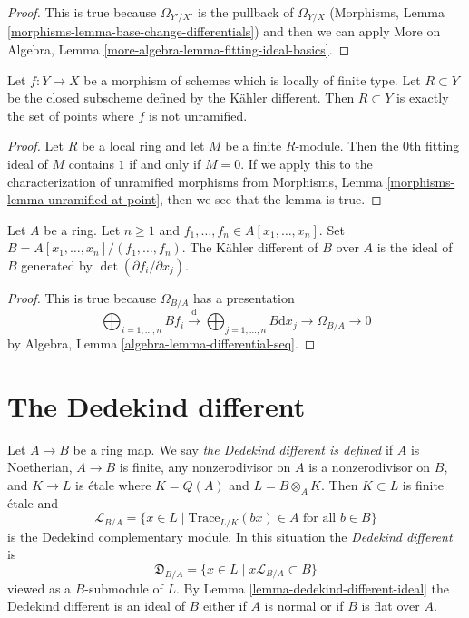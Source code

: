 \begin{proof}
This is true because $\Omega_{Y'/X'}$ is the pullback of $\Omega_{Y/X}$
(Morphisms, Lemma \ref{morphisms-lemma-base-change-differentials})
and then we can apply
More on Algebra, Lemma \ref{more-algebra-lemma-fitting-ideal-basics}.
\end{proof}

\begin{lemma}
\label{lemma-kahler-different}
Let $f : Y \to X$ be a morphism of schemes which is locally of finite type.
Let $R \subset Y$ be the closed subscheme defined by
the K\"ahler different. Then $R \subset Y$ is exactly
the set of points where $f$ is not unramified.
\end{lemma}

\begin{proof}
Let $R$ be a local ring and let $M$ be a finite $R$-module.
Then the $0$th fitting ideal of $M$ contains $1$ if and only
if $M = 0$. If we apply this to the characterization of
unramified morphisms from
Morphisms, Lemma \ref{morphisms-lemma-unramified-at-point},
then we see that the lemma is true.
\end{proof}

\begin{lemma}
\label{lemma-kahler-different-complete-intersection}
Let $A$ be a ring. Let $n \geq 1$ and
$f_1, \ldots, f_n \in A[x_1, \ldots, x_n]$.
Set $B = A[x_1, \ldots, x_n]/(f_1, \ldots, f_n)$.
The K\"ahler different of $B$ over $A$ is the ideal
of $B$ generated by $\det(\partial f_i/\partial x_j)$.
\end{lemma}

\begin{proof}
This is true because $\Omega_{B/A}$ has a presentation
$$
\bigoplus\nolimits_{i = 1, \ldots, n} B f_i
\xrightarrow{\text{d}}
\bigoplus\nolimits_{j = 1, \ldots, n} B \text{d}x_j
\rightarrow \Omega_{B/A} \rightarrow 0
$$
by Algebra, Lemma \ref{algebra-lemma-differential-seq}.
\end{proof}



\section{The Dedekind different}
\label{section-dedekind-different}

\noindent
Let $A \to B$ be a ring map. We say {\it the Dedekind different is defined}
if $A$ is Noetherian, $A \to B$ is finite,
any nonzerodivisor on $A$ is a nonzerodivisor on $B$, and $K \to L$ is
\'etale where $K = Q(A)$ and $L = B \otimes_A K$. Then $K \subset L$ is
finite \'etale and
$$
\mathcal{L}_{B/A} = \{x \in L \mid \text{Trace}_{L/K}(bx) \in A
\text{ for all }b \in B\}
$$
is the Dedekind complementary module. In this situation the
{\it Dedekind different} is
$$
\mathfrak{D}_{B/A} = \{x \in L \mid x\mathcal{L}_{B/A} \subset B\}
$$
viewed as a $B$-submodule of $L$.
By Lemma \ref{lemma-dedekind-different-ideal} the Dedekind different is an
ideal of $B$ either if $A$ is normal or if $B$ is flat over $A$.

